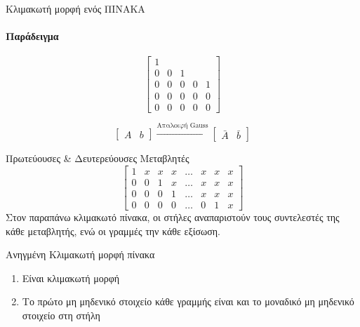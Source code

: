 \documentclass[11pt,a4paper,notitlepage,fleqn,final]{article}
\begin{document}
\begin{itemize}
\begin{defn}{Κλιμακωτή μορφή ενός ΠΙΝΑΚΑ}{}
		\paragraph{Παράδειγμα}
		\[
		\left[\begin{matrix}
		1 & & & & \\0 & 0 & 1 & & \\
		0 & 0 & 0 & 0 & 1 \\
		0 & 0 & 0 & 0 & 0 \\
		0 & 0 & 0 & 0 & 0
		\end{matrix}\right]
		\]
	\end{defn}
	\[
	\left[\begin{array}{c|c}
	A & b\end{array}
	\right]
	 \xrightarrow{\text{Απαλοιφή Gauss}} \left[\begin{array}{c|c}
	\bar A & \bar b
	\end{array}
	\right]
	\]
	\begin{defn}{Πρωτεύουσες \& Δευτερεύουσες Μεταβλητές}{}
		\[
		\left[\begin{array}{ccccccc|c}
		\boxed{1}&x&x&x&\hdots &x&x&x \\
		0 & 0 & \boxed{1} & x & \hdots & x & x & x \\
		0 & 0 & 0 & \boxed{1} & \hdots & x & x & x \\
		0 & 0 & 0 & 0 & \hdots & 0 & \boxed{1} & x
		\end{array}\right]
		\]
		\tcblower
		Στον παραπάνω κλιμακωτό πίνακα, οι στήλες αναπαριστούν τους
		συντελεστές της κάθε μεταβλητής, ενώ οι γραμμές την κάθε
		εξίσωση.
	\end{defn}
	\begin{defn}{Ανηγμένη Κλιμακωτή μορφή πίνακα}{}
		\begin{enumerate}
			\item Είναι κλιμακωτή μορφή
			\item Το πρώτο μη μηδενικό στοιχείο κάθε γραμμής είναι και το
			μοναδικό μη μηδενικό στοιχείο στη στήλη
		\end{enumerate}
	\end{defn}

\end{itemize}
\end{document}

